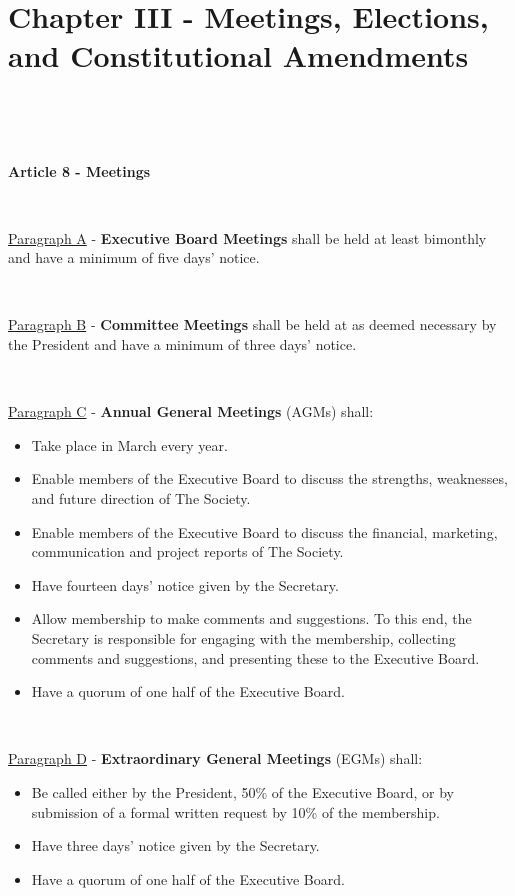 \section{Chapter III - Meetings, Elections,\\and Constitutional Amendments}

~

~

\large{\textbf{Article 8 - Meetings}}

~

\underline{Paragraph A} - \textbf{Executive Board Meetings} shall be
held at least bimonthly and have a minimum of five days' notice.

~

\underline{Paragraph B} - \textbf{Committee Meetings} shall be
held at as deemed necessary by the President and have a minimum of three days' notice.

~

\underline{Paragraph C} - \textbf{Annual General Meetings} (AGMs) shall:

\begin{itemize}

    \item{Take place in March every year.}

    \item{Enable members of the Executive Board to discuss the strengths, weaknesses, and future direction of The Society.}

    \item{Enable members of the Executive Board to discuss the financial, marketing, communication and project reports of The Society.}

    \item{Have fourteen days' notice given by the Secretary.}

    \item{Allow membership to make comments and suggestions. To this end, the Secretary is responsible for engaging with the membership, collecting comments and suggestions, and presenting these to the Executive Board.}

    \item{Have a quorum of one half of the Executive Board.}

\end{itemize}

~

\underline{Paragraph D} - \textbf{Extraordinary General Meetings} (EGMs)
shall:

\begin{itemize}

    \item{Be called either by the President, 50\% of the Executive Board, or by submission of a formal written request by 10\% of the membership.}

    \item{Have three days' notice given by the Secretary.}

    \item{Have a quorum of one half of the Executive Board.}

\end{itemize}

